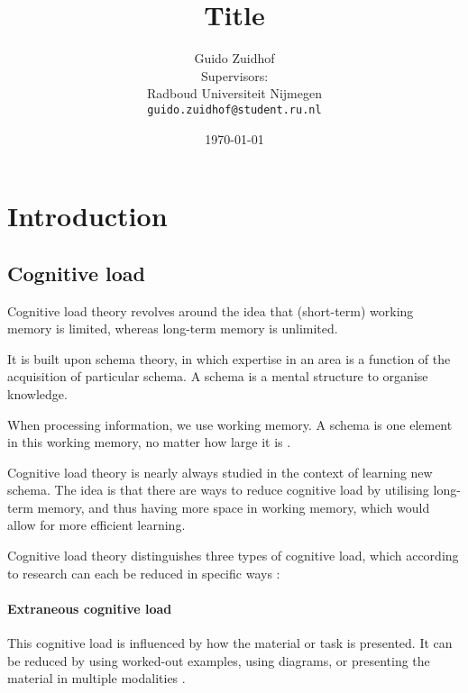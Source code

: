 \documentclass[12pt,fleqn,leqno,letterpaper]{article}
\title{Title}
\author{Guido Zuidhof\\
  \small{ Supervisors:  }\\
  \small{Radboud Universiteit Nijmegen}\\
  \small{\texttt{guido.zuidhof@student.ru.nl}}
}
\date{\today}
\begin{document}
\maketitle



\begin{abstract}
\end{abstract}

\section{Introduction}
\subsection{Cognitive load}
Cognitive load theory \citep{Sweller1994} revolves around the idea that (short-term) working memory is limited, whereas long-term memory is unlimited. 

It is built upon schema theory, in which expertise in an area is a function of the acquisition of particular schema.
A schema is a mental structure to organise knowledge.

When processing information, we use working memory. A schema is one element in this working memory, no matter how large it is \citep{mayer2014cambridge}. 

Cognitive load theory is nearly always studied in the context of learning new schema. The idea is that there are ways to reduce cognitive load by utilising long-term memory, and thus having more space in working memory, which would allow for more efficient learning.

Cognitive load theory distinguishes three types of cognitive load, which according to research can each be reduced in specific ways \citep{mayer2002multimedia}:


\paragraph{Extraneous cognitive load}
This cognitive load is influenced by how the material or task is presented. It can be reduced by using worked-out examples, using diagrams, or presenting the material in multiple modalities \citep{mousavi1995reducing}.
\end{document}
